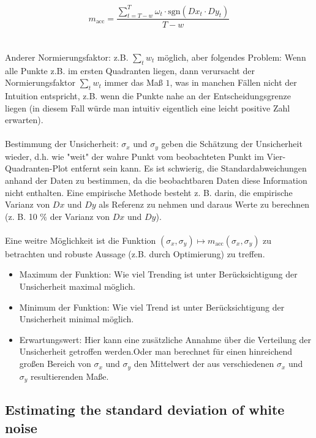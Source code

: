 \documentclass[oneside]{article}
\theoremstyle{plain}%
\theoremstyle{definition}
\begin{document}
\[m_{\text{acc}} = \frac{\sum_{t=T-w}^T \omega_t \cdot \text{sgn}(Dx_t\cdot Dy_t)}{T-w}\]\\\\
Anderer Normierungsfaktor: z.B. $\sum_t w_t$ möglich, aber folgendes Problem: Wenn alle Punkte z.B. im ersten Quadranten liegen, dann verursacht der Normierungsfaktor $\sum_t w_t$ immer das Maß $1$, was in manchen Fällen nicht der Intuition entspricht, z.B. wenn die Punkte nahe an der Entscheidungsgrenze liegen (in diesem Fall würde man intuitiv eigentlich eine leicht positive Zahl erwarten). \\\\
Bestimmung der Unsicherheit: $\sigma_x$ und $\sigma_y$ geben die Schätzung der Unsicherheit wieder, d.h. wie "weit" der wahre Punkt vom beobachteten Punkt im Vier-Quadranten-Plot entfernt sein kann. Es ist schwierig, die Standardabweichungen anhand der Daten zu bestimmen, da die beobachtbaren Daten diese Information nicht enthalten. Eine empirische Methode besteht z. B. darin, die empirische Varianz von $Dx$ und $Dy$ als Referenz zu nehmen und daraus Werte zu berechnen (z. B. 10 $\%$ der Varianz von $Dx$ und $Dy$).\\\\
Eine weitre Möglichkeit ist die Funktion $(\sigma_x,\sigma_y)\mapsto m_{\text{acc}}(\sigma_x,\sigma_y)$ zu betrachten und robuste Aussage (z.B. durch Optimierung) zu treffen. 

\begin{itemize}
     \item Maximum der Funktion: Wie viel Trending ist unter Berücksichtigung der Unsicherheit maximal möglich.
    \item Minimum der Funktion: Wie viel Trend ist unter Berücksichtigung der Unsicherheit minimal möglich.
    \item Erwartungswert: Hier kann eine zusätzliche Annahme über die Verteilung der Unsicherheit getroffen werden.Oder man berechnet für einen hinreichend großen Bereich von $\sigma_x$ und $\sigma_y$ den Mittelwert der aus verschiedenen $\sigma_x$ und $\sigma_y$ resultierenden Maße.
\end{itemize}



\subsection{Estimating the standard deviation of white noise}
\end{document}
